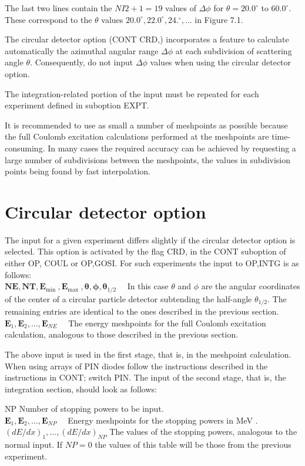 \documentclass[10pt]{article}
\begin{document}
The last two lines contain the $N I 2+1=19$ values of $\Delta \phi$ for $\theta=20.0^{\circ}$ to $60.0^{\circ}$. These correspond to the $\theta$ values $20.0^{\circ}, 22.0^{\circ}, 24 .^{\circ}, \ldots$ in Figure 7.1.

The circular detector option (CONT CRD,) incorporates a feature to calculate automatically the azimuthal angular range $\Delta \phi$ at each subdivision of scattering angle $\theta$. Consequently, do not input $\Delta \phi$ values when using the circular detector option.

The integration-related portion of the input must be repeated for each experiment defined in suboption EXPT.

It is recommended to use as small a number of meshpoints as possible because the full Coulomb excitation calculations performed at the meshpoints are time-consuming. In many cases the required accuracy can be achieved by requesting a large number of subdivisions between the meshpoints, the values in subdivision points being found by fast interpolation.

\section*{Circular detector option}
The input for a given experiment differs slightly if the circular detector option is selected. This option is activated by the flag CRD, in the CONT suboption of either OP, COUL or OP,GOSI. For such experiments the input to OP,INTG is as follows:\\
$\mathbf{N E}, \mathbf{N T}, \mathbf{E}_{\text {min }}, \mathbf{E}_{\text {max }}, \boldsymbol{\theta}, \boldsymbol{\phi}, \boldsymbol{\theta}_{1 / 2} \quad$ In this case $\theta$ and $\phi$ are the angular coordinates of the center of a circular particle detector subtending the half-angle $\theta_{1 / 2}$. The remaining entries are identical to the ones described in the previous section.\\
$\mathbf{E}_{1}, \mathbf{E}_{2}, \ldots, \mathbf{E}_{N E} \quad$ The energy meshpoints for the full Coulomb excitation calculation, analogous to those described in the previous section.

The above input is used in the first stage, that is, in the meshpoint calculation. When using arrays of PIN diodes follow the instructions described in the instructions in CONT; switch PIN. The input of the second stage, that is, the integration section, should look as follows:

NP Number of stopping powers to be input.\\
$\mathbf{E}_{1}, \mathbf{E}_{2}, \ldots, \mathbf{E}_{N P} \quad$ Energy meshpoints for the stopping powers in MeV .\\
$(d E / d x)_{1}, \ldots,(d E / d x)_{N P}$ The values of the stopping powers, analogous to the normal input. If $N P=0$ the values of this table will be those from the previous experiment.
\end{document}

